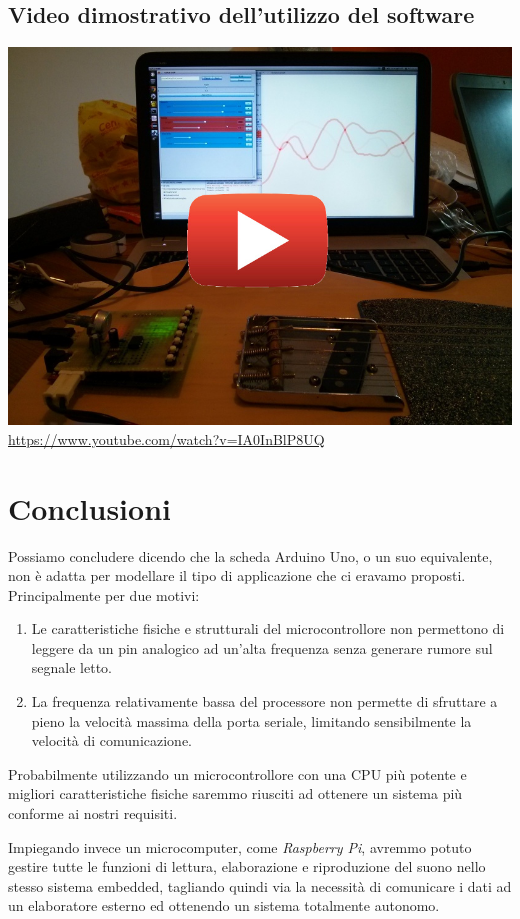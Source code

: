 \documentclass[a4paper,11pt]{article}
\begin{document}
\subsection{Video dimostrativo dell'utilizzo del software}
\href{https://www.youtube.com/watch?v=IA0InBlP8UQ}{\includegraphics[width=\textwidth]{foto_7.jpg}}
\url{https://www.youtube.com/watch?v=IA0InBlP8UQ}

\section{Conclusioni}
Possiamo concludere dicendo che la scheda Arduino Uno, o un suo equivalente, non è adatta per modellare il tipo di applicazione che ci eravamo proposti. Principalmente per due motivi:
\begin{enumerate}
	\item Le caratteristiche fisiche e strutturali del microcontrollore non permettono di leggere da un pin analogico ad un'alta frequenza senza generare rumore sul segnale letto.
	\item La frequenza relativamente bassa del processore non permette di sfruttare a pieno la velocità massima della porta seriale, limitando sensibilmente la velocità di comunicazione.
\end{enumerate}

Probabilmente utilizzando un microcontrollore con una CPU più potente e migliori caratteristiche fisiche saremmo riusciti ad ottenere un sistema più conforme ai nostri requisiti.

Impiegando invece un microcomputer, come \emph{Raspberry Pi}, avremmo potuto gestire tutte le funzioni di lettura, elaborazione e riproduzione del suono nello stesso sistema embedded, tagliando quindi via la necessità di comunicare i dati ad un elaboratore esterno ed ottenendo un sistema totalmente autonomo.
\end{document}

